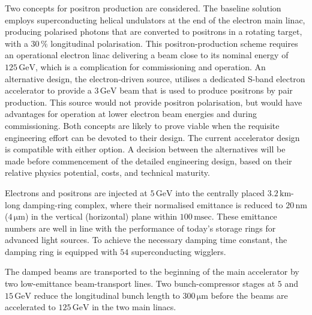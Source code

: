 \documentclass[%
 reprint,
 amsmath,amssymb,
 aps,
]{revtex4-1}
\begin{document}
Two concepts for positron production are considered.
The baseline solution employs superconducting helical undulators at
the end of the electron main linac, producing polarised photons that
are converted to positrons
in a rotating target, with a $30\,\%$
 longitudinal polarisation. 
This positron-production scheme requires an operational electron linac
delivering a beam close to its nominal energy of
$125\,{\mathrm{GeV}}$, 
which is a complication for commissioning and operation. 
An alternative design, the electron-driven source, utilises a dedicated S-band electron accelerator to provide a $3\,{\mathrm{GeV}}$ beam that is used to produce positrons by pair production.
This source would not provide positron polarisation,
but would have advantages for operation at lower electron beam energies and during commissioning.
Both concepts are
likely to prove viable when the requisite engineering effort can be devoted to their design.
The current accelerator design is compatible with either option. 
A decision between the alternatives will be made before commencement of the detailed engineering design, based on their relative physics potential, costs, and technical maturity.

Electrons and positrons are injected at $5\,{\mathrm{GeV}}$ into the
centrally placed $3.2\,{\mathrm{km}}$-long damping-ring complex, where
their normalised emittance is reduced to $20\,{\mathrm{nm}}$
($4\,{\mathrm{\mu m}}$) 
in the vertical (horizontal) plane within $100\,{\mathrm{msec}}$. 
These emittance numbers are well in line with 
the performance of today's storage rings for advanced light sources.
To achieve the necessary damping time constant,
 the damping ring is equipped with $54$ superconducting wigglers. 

The damped beams are transported to the beginning of the main
accelerator by two low-emittance beam-transport lines. Two
bunch-compressor stages at $5$ and $15\,{\mathrm{GeV}}$ reduce the
longitudinal bunch length to $300\,{\mathrm{\mu m}}$ before the beams
are accelerated to $125\,{\mathrm{GeV}}$
 in the two main linacs.
\end{document}
